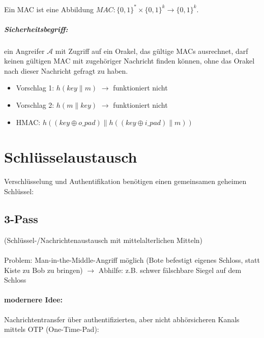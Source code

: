 \documentclass[a4paper,twoside,DIV15,BCOR12mm]{scrbook}
\begin{document}
Ein MAC ist eine Abbildung ${MAC} \colon {\{ 0, 1 \}}^* \times {\{ 0, 1 \}}^{k}\rightarrow {\{ 0, 1 \}}^k$.

\paragraph{Sicherheitsbegriff:} ein Angreifer $\mathcal{A}$ mit Zugriff auf ein Orakel, das gültige MACs ausrechnet, darf keinen gültigen MAC mit zugehöriger Nachricht finden können, ohne das Orakel nach dieser Nachricht gefragt zu haben.

\begin{itemize}
	\item Vorschlag 1: $h(key \| m)$ $\rightarrow$ funktioniert nicht 
	\item Vorschlag 2: $h(m \| key)$ $\rightarrow$ funktioniert nicht 
	\item HMAC: $h((key \oplus o\_pad) \| h((key \oplus i\_pad) \| m))$
\end{itemize}



\chapter{Schlüsselaustausch}

Verschlüsselung und Authentifikation benötigen einen gemeinsamen geheimen Schlüssel:

\section{3-Pass}

(Schlüssel-/Nachrichtenaustausch mit mittelalterlichen Mitteln)\\

\\

Problem: Man-in-the-Middle-Angriff möglich (Bote befestigt eigenes Schloss, statt Kiste zu Bob zu bringen) $\rightarrow$ Abhilfe: z.B. schwer fälschbare Siegel auf dem Schloss

\subsubsection{modernere Idee:}

Nachrichtentransfer über authentifizierten, aber nicht abhörsicheren Kanals mittels OTP (One-Time-Pad):\\
\end{document}
